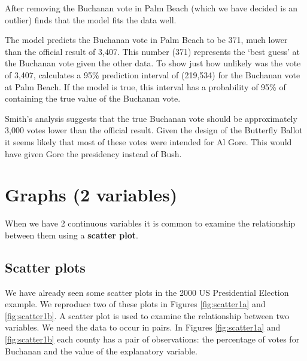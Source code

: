 \documentclass[
  british,
]{book}
\begin{document}
After removing the Buchanan vote in Palm Beach (which we have decided is an outlier) \citet{election} finds that the model fits the data well.

The model predicts the Buchanan vote in Palm Beach to be 371, much lower than the official result of 3,407. This number (371) represents the `best guess' at the Buchanan vote given the other data. To show just how unlikely was the vote of 3,407, \citet{election} calculates a 95\% prediction interval of (219,534) for the Buchanan vote at Palm Beach. If the model is true, this interval has a probability of 95\% of containing the true value of the Buchanan vote.

Smith's analysis suggests that the true Buchanan vote should be approximately 3,000 votes lower than the official result. Given the design of the Butterfly Ballot it seems likely that most of these votes were intended for Al Gore. This would have given Gore the presidency instead of Bush.

\hypertarget{graphs2}{%
\section{Graphs (2 variables)}\label{graphs2}}

When we have 2 continuous variables it is common to examine the relationship between them using a \textbf{scatter plot}.

\hypertarget{scatter-plots}{%
\subsection{Scatter plots}\label{scatter-plots}}

We have already seen some scatter plots in the 2000 US Presidential Election example. We reproduce two of these plots in Figures \ref{fig:scatter1a} and \ref{fig:scatter1b}. A scatter plot is used to examine the relationship between two variables. We need the data to occur in pairs. In Figures \ref{fig:scatter1a} and \ref{fig:scatter1b} each county has a pair of observations: the percentage of votes for Buchanan and the value of the explanatory variable.
\end{document}

